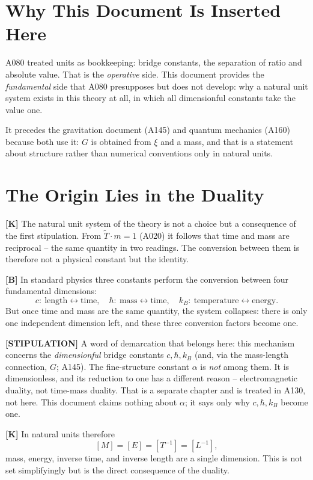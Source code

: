 \section{Why This Document Is Inserted Here}

A080 treated units as bookkeeping: bridge constants, the separation of ratio
and absolute value. That is the \emph{operative} side. This document provides
the \emph{fundamental} side that A080 presupposes but does not develop: why a
natural unit system exists in this theory at all, in which all dimensionful
constants take the value one.

It precedes the gravitation document (A145) and quantum mechanics (A160)
because both use it: $G$ is obtained from $\xi$ and a mass, and that is a
statement about structure rather than numerical conventions only in natural units.

\section{The Origin Lies in the Duality}

\textbf{[K]} The natural unit system of the theory is not a choice but a
consequence of the first stipulation. From $\tilde T\cdot m = 1$ (A020) it
follows that time and mass are reciprocal -- the same quantity in two readings.
The conversion between them is therefore not a physical constant but the
identity.

\textbf{[B]} In standard physics three constants perform the conversion between
four fundamental dimensions:
\[
  c:\ \text{length}\leftrightarrow\text{time},\quad
  \hbar:\ \text{mass}\leftrightarrow\text{time},\quad
  k_B:\ \text{temperature}\leftrightarrow\text{energy}.
\]
But once time and mass are the same quantity, the system collapses: there is
only one independent dimension left, and these three conversion factors become
one.

\textbf{[STIPULATION]} A word of demarcation that belongs here: this mechanism
concerns the \emph{dimensionful} bridge constants $c, \hbar, k_B$ (and, via
the mass-length connection, $G$; A145). The fine-structure constant $\alpha$
is \emph{not} among them. It is dimensionless, and its reduction to one has a
different reason -- electromagnetic duality, not time-mass duality. That is a
separate chapter and is treated in A130, not here. This document claims nothing
about $\alpha$; it says only why $c, \hbar, k_B$ become one.

\textbf{[K]} In natural units therefore
\[
  [M] = [E] = [T^{-1}] = [L^{-1}],
\]
mass, energy, inverse time, and inverse length are a single dimension. This is
not set simplifyingly but is the direct consequence of the duality.

